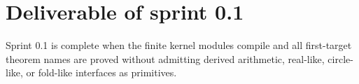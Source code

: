 \section{Deliverable of sprint 0.1}

Sprint 0.1 is complete when the finite kernel modules compile and all first-target theorem names are proved without admitting derived arithmetic, real-like, circle-like, or fold-like interfaces as primitives.
